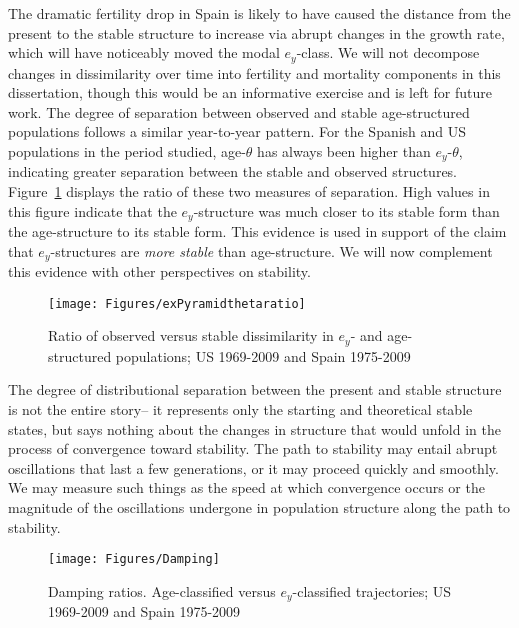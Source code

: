 The dramatic fertility drop in Spain is likely to have caused the distance
from the present to the stable structure to increase via abrupt changes in the
growth rate, which will have noticeably moved the modal $e_y$-class. We
will not decompose changes in dissimilarity over time into fertility and
mortality components in this dissertation, though this would be an informative
exercise and is left for future work. The degree of separation
between observed and stable age-structured populations follows a similar
year-to-year pattern. For the Spanish and US populations in the period studied,
age-$\theta$ has always been higher than $e_y$-$\theta$, indicating greater
separation between the stable and observed structures.
Figure~\ref{fig:exPyramidthetaratio} displays the ratio of these two measures 
of separation. High values in this figure indicate that the $e_y$-structure was
 much closer to its stable form than the age-structure to its stable form. This
evidence is used in support of the claim that $e_y$-structures are \textit{more
stable} than age-structure. We will now complement this evidence with other
perspectives on stability.

\begin{figure}[ht!]
       \centering
       \caption{Ratio of observed versus stable dissimilarity in $e_y$- and
       age-structured populations; US 1969-2009 and Spain 1975-2009}
        \texttt{[image: Figures/exPyramidthetaratio]}
        \label{fig:exPyramidthetaratio}
\end{figure}

The degree of distributional separation between the present and stable
structure is not the entire story-- it represents only the starting and
theoretical stable states, but says nothing about the changes in structure that
would unfold in the process of convergence toward stability. The path to
stability may entail abrupt oscillations that last a few generations, or it may
proceed quickly and smoothly. We may measure such things as the speed at which
convergence occurs or the magnitude of the oscillations undergone in 
population structure along the path to stability. 

\begin{figure}[ht!]
       \centering
       \caption{Damping ratios. Age-classified versus $e_y$-classified
       trajectories; US 1969-2009 and Spain 1975-2009}
        \texttt{[image: Figures/Damping]}
        \label{fig:damping}
\end{figure}

